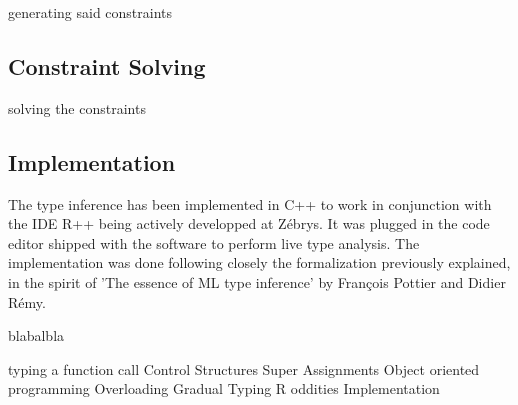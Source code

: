 generating said constraints

\subsection{Constraint Solving}

solving the constraints

\subsection{Implementation}


The type inference has been implemented in C++ to work in conjunction with the IDE R++ being actively developped at Z\'ebrys. It was plugged in the code editor shipped with the software to perform live type analysis. The implementation was done following closely the formalization previously explained, in the spirit of 'The essence of ML type inference' by Fran\c cois Pottier and Didier R\'emy.

blabalbla

typing a function call
Control Structures
Super Assignments
Object oriented programming
Overloading
Gradual Typing
R oddities
Implementation
